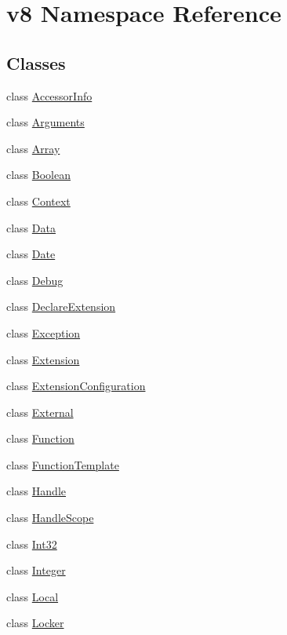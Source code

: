 \hypertarget{namespacev8}{}\section{v8 Namespace Reference}
\label{namespacev8}
\subsection*{Classes}
\begin{DoxyCompactItemize}
\item 
class \hyperlink{classv8_1_1_accessor_info}{Accessor\+Info}
\item 
class \hyperlink{classv8_1_1_arguments}{Arguments}
\item 
class \hyperlink{classv8_1_1_array}{Array}
\item 
class \hyperlink{classv8_1_1_boolean}{Boolean}
\item 
class \hyperlink{classv8_1_1_context}{Context}
\item 
class \hyperlink{classv8_1_1_data}{Data}
\item 
class \hyperlink{classv8_1_1_date}{Date}
\item 
class \hyperlink{classv8_1_1_debug}{Debug}
\item 
class \hyperlink{classv8_1_1_declare_extension}{Declare\+Extension}
\item 
class \hyperlink{classv8_1_1_exception}{Exception}
\item 
class \hyperlink{classv8_1_1_extension}{Extension}
\item 
class \hyperlink{classv8_1_1_extension_configuration}{Extension\+Configuration}
\item 
class \hyperlink{classv8_1_1_external}{External}
\item 
class \hyperlink{classv8_1_1_function}{Function}
\item 
class \hyperlink{classv8_1_1_function_template}{Function\+Template}
\item 
class \hyperlink{classv8_1_1_handle}{Handle}
\item 
class \hyperlink{classv8_1_1_handle_scope}{Handle\+Scope}
\item 
class \hyperlink{classv8_1_1_int32}{Int32}
\item 
class \hyperlink{classv8_1_1_integer}{Integer}
\item 
class \hyperlink{classv8_1_1_local}{Local}
\item 
class \hyperlink{classv8_1_1_locker}{Locker}
\item 

\end{DoxyCompactItemize}
